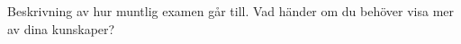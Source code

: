 



\TODO Beskrivning av hur muntlig examen går till. Vad händer om du behöver visa mer av dina kunskaper?
